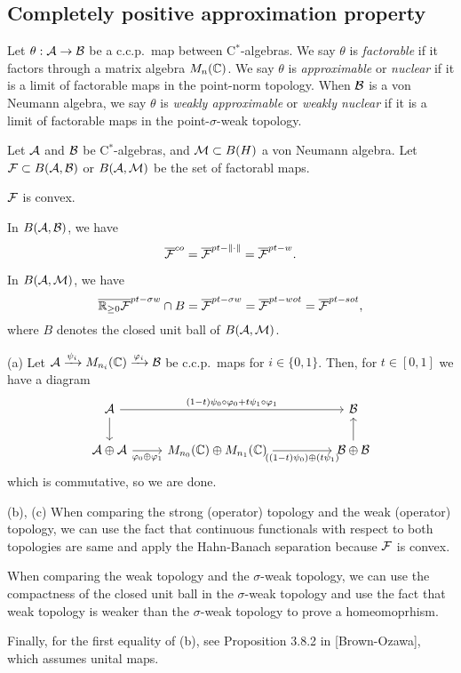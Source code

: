 \documentclass{../../small}
\begin{document}
\subsection{Completely positive approximation property}

\begin{defn}
Let $\theta:\mathcal{A}\to\mathcal{B}$ be a c.c.p.~map between C$^*$-algebras.
We say $\theta$ is \emph{factorable} if it factors through a matrix algebra $M_n(\mathbb{C})$.
We say $\theta$ is \emph{approximable} or \emph{nuclear} if it is a limit of factorable maps in the point-norm topology.
When $\mathcal{B}$ is a von Neumann algebra, we say $\theta$ is \emph{weakly approximable} or \emph{weakly nuclear} if it is a limit of factorable maps in the point-$\sigma$-weak topology.
\end{defn}

\begin{prop}
Let $\mathcal{A}$ and $\mathcal{B}$ be C$^*$-algebras, and $\mathcal{M}\subset B(H)$ a von Neumann algebra.
Let $\mathcal{F}\subset B(\mathcal{A},\mathcal{B})$ or $B(\mathcal{A},\mathcal{M})$ be the set of factorabl maps.
\begin{parts}
\item $\mathcal{F}$ is convex.
\item In $B(\mathcal{A},\mathcal{B})$, we have
\[\overline{\mathcal{F}}^{co}=\overline{\mathcal{F}}^{pt-\|\cdot\|}=\overline{\mathcal{F}}^{pt-w}.\]
\item In $B(\mathcal{A},\mathcal{M})$, we have
\[\overline{\mathbb{R}_{\ge0}\mathcal{F}}^{pt-\sigma w}\cap B=\overline{\mathcal{F}}^{pt-\sigma w}=\overline{\mathcal{F}}^{pt-wot}=\overline{\mathcal{F}}^{pt-sot},\]
where $B$ denotes the closed unit ball of $B(\mathcal{A},\mathcal{M})$.
\end{parts}
\end{prop}
\begin{pf}[Sketch]
(a)
Let $\mathcal{A}\xrightarrow{\psi_i}M_{n_i}(\mathbb{C})\xrightarrow{\varphi_i}\mathcal{B}$ be c.c.p.~maps for $i\in\{0,1\}$.
Then, for $t\in[0,1]$ we have a diagram
\[\begin{tikzcd}
\cA \ar{rrr}{(1-t)\psi_0\circ\f_0+t\psi_1\circ\f_1}\ar{d}&&&\cB\\
\cA\oplus\cA\ar[swap]{r}{\f_0\oplus\f_1}&M_{n_0}(\C)\oplus M_{n_1}(\C)\ar[swap]{rr}{((1-t)\psi_0)\oplus(t\psi_1)}&&\cB\oplus\cB\ar{u}
\end{tikzcd}\]
which is commutative, so we are done.

(b), (c)
When comparing the strong (operator) topology and the weak (operator) topology, we can use the fact that continuous functionals with respect to both topologies are same and apply the Hahn-Banach separation because $\mathcal{F}$ is convex.

When comparing the weak topology and the $\sigma$-weak topology, we can use the compactness of the closed unit ball in the $\sigma$-weak topology and use the fact that weak topology is weaker than the $\sigma$-weak topology to prove a homeomoprhism.

Finally, for the first equality of (b), see Proposition 3.8.2 in [Brown-Ozawa], which assumes unital maps.
\end{pf}
\end{document}
